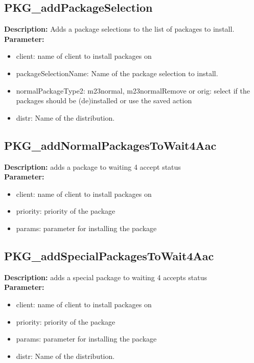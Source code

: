 \subsection{PKG\_addPackageSelection}
\textbf{Description:} Adds a package selections to the list of packages to install.\\
\textbf{Parameter:}
\begin{itemize}
\item client: name of client to install packages on
\item packageSelectionName: Name of the package selection to install.
\item normalPackageType2: m23normal, m23normalRemove or orig: select if the packages should be (de)installed or use the saved action
\item distr: Name of the distribution.
\end{itemize}

\subsection{PKG\_addNormalPackagesToWait4Aac}
\textbf{Description:} adds a package to waiting 4 accept status\\
\textbf{Parameter:}
\begin{itemize}
\item client: name of client to install packages on
\item priority: priority of the package
\item params: parameter for installing the package
\end{itemize}

\subsection{PKG\_addSpecialPackagesToWait4Aac}
\textbf{Description:} adds a special package to waiting 4 accepts status\\
\textbf{Parameter:}
\begin{itemize}
\item client: name of client to install packages on
\item priority: priority of the package
\item params: parameter for installing the package
\item distr: Name of the distribution.
\end{itemize}

